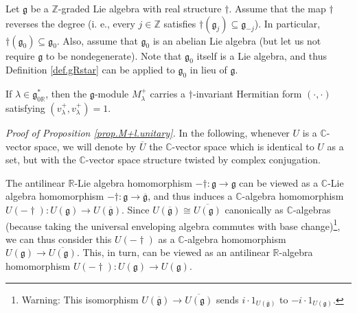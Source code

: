 \documentclass[etingof-lie.tex]{subfiles}
\begin{document}
\begin{proposition}
\label{prop.M+l.unitary}Let $\mathfrak{g}$ be a $\mathbb{Z}$-graded Lie
algebra with real structure $\dag$. Assume that the map $\dag$ reverses the
degree (i. e., every $j\in\mathbb{Z}$ satisfies $\dag\left(  \mathfrak{g}%
_{j}\right)  \subseteq\mathfrak{g}_{-j}$). In particular, $\dag\left(
\mathfrak{g}_{0}\right)  \subseteq\mathfrak{g}_{0}$. Also, assume that
$\mathfrak{g}_{0}$ is an abelian Lie algebra (but let us not require
$\mathfrak{g}$ to be nondegenerate). Note that $\mathfrak{g}_{0}$ itself is a
Lie algebra, and thus Definition \ref{def.gRstar} can be applied to
$\mathfrak{g}_{0}$ in lieu of $\mathfrak{g}$.

If $\lambda\in\mathfrak{g}_{0\mathbb{R}}^{\ast}$, then the $\mathfrak{g}%
$-module $M_{\lambda}^{+}$ carries a $\dag$-invariant Hermitian form $\left(
\cdot,\cdot\right)  $ satisfying $\left(  v_{\lambda}^{+},v_{\lambda}%
^{+}\right)  =1$.
\end{proposition}

\textit{Proof of Proposition \ref{prop.M+l.unitary}.} In the following,
whenever $U$ is a $\mathbb{C}$-vector space, we will denote by $\overline{U}$
the $\mathbb{C}$-vector space which is identical to $U$ as a set, but with the
$\mathbb{C}$-vector space structure twisted by complex conjugation.

The antilinear $\mathbb{R}$-Lie algebra homomorphism $-\dag:\mathfrak{g}%
\rightarrow\mathfrak{g}$ can be viewed as a $\mathbb{C}$-Lie algebra
homomorphism $-\dag:\mathfrak{g}\rightarrow\overline{\mathfrak{g}}$, and thus
induces a $\mathbb{C}$-algebra homomorphism $U\left(  -\dag\right)  :U\left(
\mathfrak{g}\right)  \rightarrow U\left(  \overline{\mathfrak{g}}\right)  $.
Since $U\left(  \overline{\mathfrak{g}}\right)  \cong\overline{U\left(
\mathfrak{g}\right)  }$ canonically as $\mathbb{C}$-algebras (because taking
the universal enveloping algebra commutes with base change)\footnote{Warning:
This isomorphism $U\left(  \overline{\mathfrak{g}}\right)  \rightarrow
\overline{U\left(  \mathfrak{g}\right)  }$ sends $i\cdot1_{U\left(
\overline{\mathfrak{g}}\right)  }$ to $-i\cdot1_{U\left(  \mathfrak{g}\right)
}$.}, we can thus consider this $U\left(  -\dag\right)  $ as a $\mathbb{C}%
$-algebra homomorphism $U\left(  \mathfrak{g}\right)  \rightarrow
\overline{U\left(  \mathfrak{g}\right)  }$. This, in turn, can be viewed as an
antilinear $\mathbb{R}$-algebra homomorphism $U\left(  -\dag\right)  :U\left(
\mathfrak{g}\right)  \rightarrow U\left(  \mathfrak{g}\right)  $.
\end{document}
